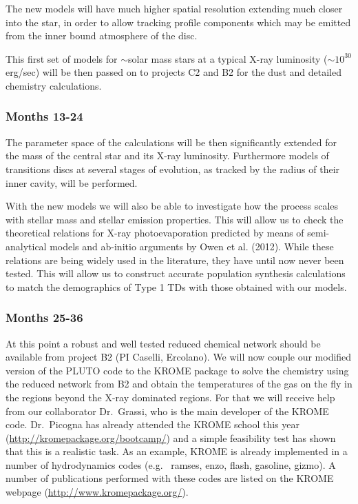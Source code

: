 \documentclass[10pt,fleqn,twoside]{article}
\begin{document}
The new models will have much higher spatial
resolution extending much closer into the star, in order to allow
tracking profile components which may be emitted from the inner bound
atmosphere of the disc. 

This first set of models for $\sim$solar mass stars at a typical X-ray
luminosity ($\sim 10^{30}$erg/sec) will be then passed on to projects
C2 and B2 for the dust and detailed chemistry calculations. 

\subsubsection{Months 13-24}

The parameter space of the calculations will be then
significantly extended for the mass of the central star and its X-ray
luminosity. Furthermore models of transitions discs at several stages
of evolution, as tracked by the radius of their inner cavity, will be
performed. 

With the new models we will also be able to investigate how
the process scales with stellar mass and stellar emission
properties. This will allow us to check the
theoretical relations for X-ray photoevaporation 
predicted by means of semi-analytical models and ab-initio arguments
by Owen et al. (2012). While these relations are being widely used in
the literature, they have until now never been tested. This will allow
us to construct accurate population synthesis calculations to match
the demographics of Type 1 TDs with those obtained with our models.\\

\subsubsection{Months 25-36} 
At this point a robust and well tested reduced chemical network should be
available from project B2 (PI Caselli, Ercolano).  We will now couple our
modified version of the PLUTO code to the KROME package to solve the
chemistry using the reduced network from B2 and obtain the temperatures of
the gas on the fly in the regions beyond the X-ray dominated regions. For
that we will receive help from our collaborator Dr.\ Grassi, who is the main
developer of the KROME code. Dr.\ Picogna has already attended the KROME
school this year (\url{http://kromepackage.org/bootcamp/}) and a simple
feasibility test has shown that this is a realistic task. As an example,
KROME is already implemented in a number of hydrodynamics codes (e.g.\ {\sc
  ramses, enzo, flash, gasoline, gizmo}). A number of publications performed
with these codes are listed on the KROME webpage
(\url{http://www.kromepackage.org/}).
\end{document}
